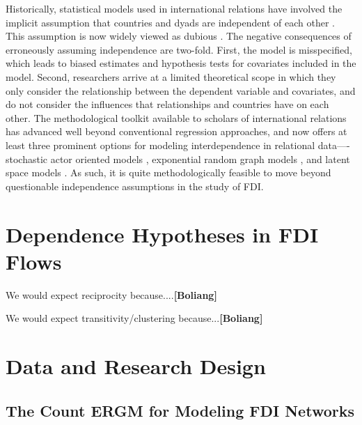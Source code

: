 \documentclass{article}
\begin{document}
Historically, statistical models used in international relations have involved the implicit assumption that countries and dyads are independent of each other \citep{diehl2016conditional,ward2007persistent}. This assumption is now widely viewed as dubious \citep[see, e.g., ][]{ward2007persistent, chu2010homogenization,cranmer2016critique,dorff2013networks,lee2013network,howell2013geography,kinne2016agreeing}. The negative consequences of erroneously assuming independence are two-fold. First, the model is misspecified, which leads to biased estimates and hypothesis tests for covariates included in the model. Second, researchers arrive at a limited theoretical scope in which they only consider the relationship between the dependent variable and covariates, and do not consider the influences that relationships and countries have on each other. The methodological toolkit available to scholars of international relations has advanced well beyond conventional regression approaches, and now offers at least three prominent options for modeling interdependence in relational data----stochastic actor oriented models \citep[e.g., ][]{camber2010geometry,kinne2016agreeing,kinne2013network,kinne2014dependent,warren2016modeling}, exponential random graph models \citep[e.g.,][]{cranmer2012complex,cranmer2012toward,raeymaeckers2016influence}, and latent space models \citep[e.g., ][]{ward2007disputes,ward2013gravity,metternich2013antigovernment}. As such, it is quite methodologically feasible to move beyond questionable independence assumptions in the study of FDI.

\section{Dependence Hypotheses in FDI Flows}

We would expect reciprocity because....{\bf [Boliang]}

We would expect transitivity/clustering because...{\bf [Boliang]}


\section{Data and Research Design}

\subsection{The Count ERGM for Modeling FDI Networks}
\end{document}
